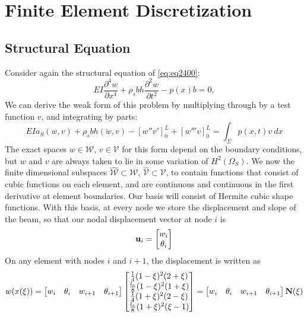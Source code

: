\documentclass{article}
\begin{document}
\section{Finite Element Discretization}
\subsection{Structural Equation}
Consider again the structural equation of \ref{eq:eq2400}:
\[ EI\frac{\partial^4 w}{\partial x^4}+\rho_s b h \frac{\partial ^2 w}{\partial t^2}-p(x)b=0, \]
We can derive the weak form of this problem by multiplying through by a test function $v$, and integrating by parts:
\begin{equation} EI a_S(w,v) + \rho_s b h( \ddot{w},v ) - \left[w'' v' \right]_0^L + \left[w''' v \right]_0^L =  \int_{\Sigma }p(x,t)v \ dx \label{eq:eq4800} \end{equation}
The exact spaces $w \in \mathcal{W}$, $v \in \mathcal{V}$ for this form depend on the boundary conditions, but $w$ and $v$ are always taken to lie in some variation of $H^2(\Omega_S)$.
We now the finite dimensional subspaces $\widehat{\mathcal{W}} \subset \mathcal{W}$, $\widehat{\mathcal{V}} \subset \mathcal{V}$, to contain functions that consist of cubic functions on each element, and are continuous and continuous in the first derivative at element boundaries.
Our basis will consist of Hermite cubic shape functions.
With this basis, at every node we store the displacement and slope of the beam, so that our nodal displacement vector at node $i$ is
\[ {\bf u}_i = \begin{bmatrix} w_i \\ \theta_i \end{bmatrix} \]
On any element with nodes $i$ and $i+1$, the displacement is written as
\begin{equation} w(x(\xi)) = \begin{bmatrix} 
w_i & \theta_i & w_{i+1} & \theta_{i+1} 
\end{bmatrix} \begin{bmatrix}
\frac{1}{4}(1-\xi)^2(2+\xi) \\
\frac{l_e}{8}(1-\xi)^2(1+\xi) \\
\frac{1}{4}(1+\xi)^2(2-\xi) \\
\frac{l_e}{8}(1+\xi)^2(\xi-1)
\end{bmatrix} =  \begin{bmatrix} 
w_i & \theta_i & w_{i+1} & \theta_{i+1} 
\end{bmatrix} {\bf N(\xi) } \label{eq:eq4900} \end{equation}
\end{document}
